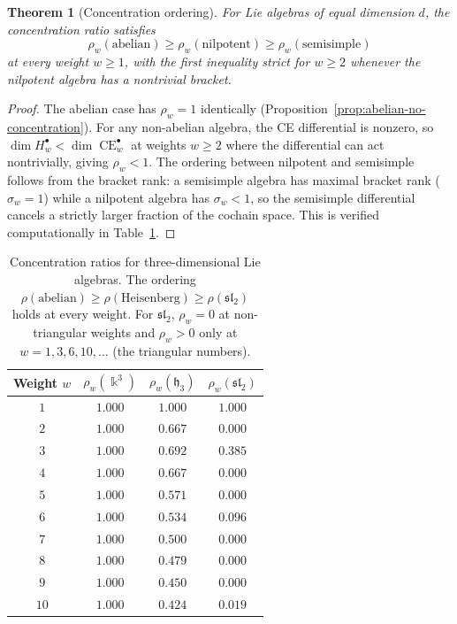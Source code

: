 \documentclass[11pt,reqno]{amsart}
\theoremstyle{plain}
\newtheorem{theorem}{Theorem}[section]
\theoremstyle{definition}
\theoremstyle{remark}
\DeclareMathOperator{\CE}{CE}
\newcommand{\fh}{\mathfrak{h}}
\newcommand{\kk}{\Bbbk}
\begin{document}
\begin{theorem}[Concentration ordering]\label{thm:ordering}
 For Lie algebras of equal dimension $d$, the concentration ratio satisfies
 \[
 \rho_w(\text{abelian}) \ge \rho_w(\text{nilpotent})
 \ge \rho_w(\text{semisimple})
 \]
 at every weight $w \ge 1$, with the first inequality strict for $w \ge 2$
 whenever the nilpotent algebra has a nontrivial bracket.
\end{theorem}

\begin{proof}
 The abelian case has $\rho_w = 1$ identically (Proposition~\ref{prop:abelian-no-concentration}). For any non-abelian algebra, the CE
 differential is nonzero, so $\dim H^\bullet_w < \dim \CE^\bullet_w$ at
 weights $w \ge 2$ where the differential can act nontrivially, giving
 $\rho_w < 1$. The ordering between nilpotent and semisimple follows
 from the bracket rank: a semisimple algebra has maximal bracket rank
 ($\sigma_w = 1$) while a nilpotent algebra has $\sigma_w < 1$, so the
 semisimple differential cancels a strictly larger fraction of the cochain
 space. This is verified computationally in Table~\ref{tab:concentration-d3}.
\end{proof}

\begin{table}[ht]
 \centering
 \begin{tabular}{c|ccc}
 \toprule
 Weight $w$ & $\rho_w(\kk^3)$ & $\rho_w(\fh_3)$ & $\rho_w(\mathfrak{sl}_2)$ \\
 \midrule
 $1$ & $1.000$ & $1.000$ & $1.000$ \\
 $2$ & $1.000$ & $0.667$ & $0.000$ \\
 $3$ & $1.000$ & $0.692$ & $0.385$ \\
 $4$ & $1.000$ & $0.667$ & $0.000$ \\
 $5$ & $1.000$ & $0.571$ & $0.000$ \\
 $6$ & $1.000$ & $0.534$ & $0.096$ \\
 $7$ & $1.000$ & $0.500$ & $0.000$ \\
 $8$ & $1.000$ & $0.479$ & $0.000$ \\
 $9$ & $1.000$ & $0.450$ & $0.000$ \\
 $10$ & $1.000$ & $0.424$ & $0.019$ \\
 \bottomrule
 \end{tabular}
 \caption{Concentration ratios for three-dimensional Lie algebras.
 The ordering $\rho(\text{abelian}) \ge \rho(\text{Heisenberg}) \ge
 \rho(\mathfrak{sl}_2)$ holds at every weight. For $\mathfrak{sl}_2$,
 $\rho_w = 0$ at non-triangular weights and $\rho_w > 0$ only at
 $w = 1, 3, 6, 10, \ldots$ (the triangular numbers).}
 \label{tab:concentration-d3}
\end{table}
\end{document}

